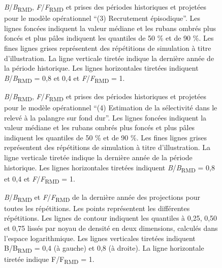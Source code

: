 \documentclass[french,11pt]{book}
\begin{document}
\begin{figure}[htb]

{\centering {} 

}

\caption{\emph{B}/\emph{B}\textsubscript{RMD}, \emph{F}/\emph{F}\textsubscript{RMD} et prises des périodes historiques et projetées pour le modèle opérationnel ``(3) Recrutement épisodique''. Les lignes foncées indiquent la valeur médiane et les rubans ombrés plus foncés et plus pâles indiquent les quantiles de 50 \% et de 90 \%. Les fines lignes grises représentent des répétitions de simulation à titre d'illustration. La ligne verticale tiretée indique la dernière année de la période historique. Les lignes horizontales tiretées indiquent \emph{B}/\emph{B}\textsubscript{RMD} = 0,8 et 0,4 et \emph{F}/\emph{F}\textsubscript{RMD} = 1.}\label{fig:proj-episodic-recruitment}
\end{figure}

\begin{figure}[htb]

{\centering {} 

}

\caption{\emph{B}/\emph{B}\textsubscript{RMD}, \emph{F}/\emph{F}\textsubscript{RMD} et prises des périodes historiques et projetées pour le modèle opérationnel ``(4) Estimation de la sélectivité dans le relevé à la palangre sur fond dur''. Les lignes foncées indiquent la valeur médiane et les rubans ombrés plus foncés et plus pâles indiquent les quantiles de 50 \% et de 90 \%. Les fines lignes grises représentent des répétitions de simulation à titre d'illustration. La ligne verticale tiretée indique la dernière année de la période historique. Les lignes horizontales tiretées indiquent \emph{B}/\emph{B}\textsubscript{RMD} = 0,8 et 0,4 et \emph{F}/\emph{F}\textsubscript{RMD} = 1.}\label{fig:proj-upweight-dogfish}
\end{figure}
\clearpage


\begin{figure}[htb]

{\centering {} 

}

\caption{\emph{B}/\emph{B}\textsubscript{RMD} et \emph{F}/\emph{F}\textsubscript{RMD} de la dernière année des projections pour toutes les répétitions. Les points représentent les différentes répétitions. Les lignes de contour indiquent les quantiles à 0,25, 0,50 et 0,75 lissés par noyau de densité en deux dimensions, calculés dans l'espace logarithmique. Les lignes verticales tiretées indiquent B/B\textsubscript{RMD} = 0,4 (à gauche) et 0,8 (à droite). La ligne horizontale tiretée indique F/F\textsubscript{RMD} = 1.}\label{fig:kobe}
\end{figure}
\clearpage
\end{document}
